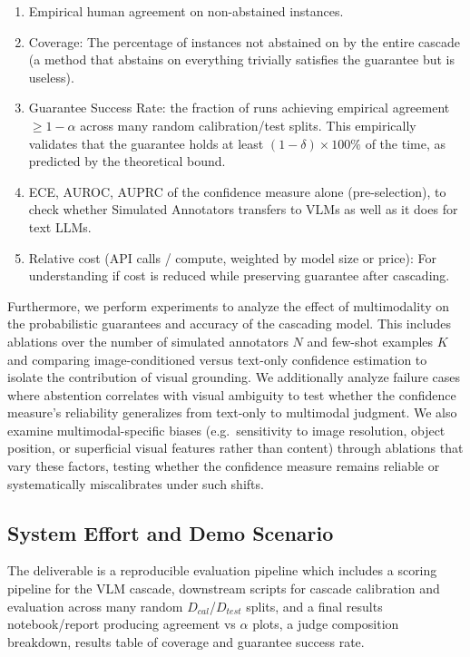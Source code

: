 \documentclass[11pt,a4paper]{article}
\begin{document}
\begin{enumerate}[leftmargin=*]
  \item Empirical human agreement on non-abstained instances.
  \item Coverage: The percentage of instances not abstained on by the entire cascade (a method that abstains on
        everything trivially satisfies the guarantee but is useless).
  \item Guarantee Success Rate:  the fraction
      of runs achieving empirical agreement $\ge 1-\alpha$ across many random calibration/test splits. This empirically validates that the
      guarantee holds at least $(1-\delta)\times 100\%$ of the time, as predicted by the
      theoretical bound.
  \item ECE, AUROC, AUPRC of the confidence measure alone (pre-selection), to check
        whether Simulated Annotators transfers to VLMs as well as it does for text LLMs.
  \item Relative cost (API calls / compute, weighted by model size or price):  For understanding if cost is reduced while preserving
        guarantee after cascading.
\end{enumerate}


Furthermore, we perform experiments to analyze the effect of multimodality on the probabilistic
guarantees and accuracy of the cascading model. This includes ablations over the number of
simulated annotators $N$ and few-shot examples $K$ and comparing image-conditioned versus text-only confidence estimation to
isolate the contribution of visual grounding. We additionally analyze failure cases where
abstention correlates with visual ambiguity to test whether the confidence measure's
reliability generalizes from text-only to multimodal judgment. We also examine multimodal-specific biases (e.g.\ sensitivity to image resolution, object
position, or superficial visual features rather than content) through ablations that vary these
factors, testing whether the confidence measure remains reliable or systematically miscalibrates
under such shifts.


\subsection{System Effort and Demo Scenario}

The deliverable is a reproducible evaluation pipeline which includes a scoring pipeline for the VLM cascade, downstream scripts for cascade calibration and
evaluation across many random $D_{cal}$/$D_{test}$ splits, and a final results notebook/report
producing agreement vs $\alpha$ plots, a judge composition breakdown, results table of coverage and guarantee success rate.
 
\end{document}
